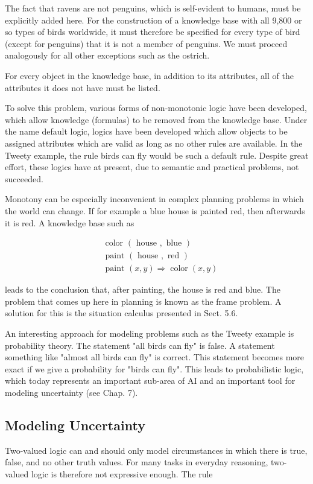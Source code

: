 \documentclass[10pt]{book}
\begin{document}
The fact that ravens are not penguins, which is self-evident to humans, must be explicitly added here. For the construction of a knowledge base with all 9,800 or so types of birds worldwide, it must therefore be specified for every type of bird (except for penguins) that it is not a member of penguins. We must proceed analogously for all other exceptions such as the ostrich.

For every object in the knowledge base, in addition to its attributes, all of the attributes it does not have must be listed.

To solve this problem, various forms of non-monotonic logic have been developed, which allow knowledge (formulas) to be removed from the knowledge base. Under the name default logic, logics have been developed which allow objects to be assigned attributes which are valid as long as no other rules are available. In the Tweety example, the rule birds can fly would be such a default rule. Despite great effort, these logics have at present, due to semantic and practical problems, not succeeded.

Monotony can be especially inconvenient in complex planning problems in which the world can change. If for example a blue house is painted red, then afterwards it is red. A knowledge base such as

$$
\begin{aligned}
& \text { color }(\text { house }, \text { blue }) \\
& \text { paint }(\text { house }, \text { red }) \\
& \text { paint }(x, y) \Rightarrow \operatorname{color}(x, y)
\end{aligned}
$$

leads to the conclusion that, after painting, the house is red and blue. The problem that comes up here in planning is known as the frame problem. A solution for this is the situation calculus presented in Sect. 5.6.

An interesting approach for modeling problems such as the Tweety example is probability theory. The statement "all birds can fly" is false. A statement something like "almost all birds can fly" is correct. This statement becomes more exact if we give a probability for "birds can fly". This leads to probabilistic logic, which today represents an important sub-area of AI and an important tool for modeling uncertainty (see Chap. 7).

\subsection{Modeling Uncertainty}
Two-valued logic can and should only model circumstances in which there is true, false, and no other truth values. For many tasks in everyday reasoning, two-valued logic is therefore not expressive enough. The rule
\end{document}
